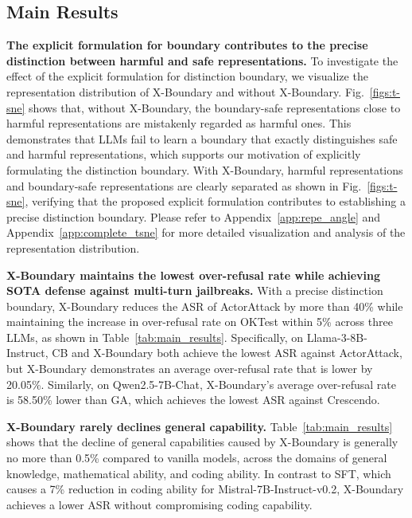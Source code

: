 \subsection{Main Results}
\textbf{The explicit formulation for boundary contributes to the precise distinction between harmful and safe representations.}
To investigate the effect of the explicit formulation for distinction boundary, we visualize the representation distribution of X-Boundary and without X-Boundary. 
%
Fig.~\ref{figs:t-sne} shows that, without X-Boundary, the boundary-safe representations close to harmful representations are mistakenly regarded as harmful ones.
%
This demonstrates that LLMs fail to learn a boundary that exactly distinguishes safe and harmful representations, which supports our motivation of explicitly formulating the distinction boundary.
%
With X-Boundary, harmful representations and boundary-safe representations are clearly separated as shown in Fig.~\ref{figs:t-sne}, verifying that the proposed explicit formulation contributes to establishing a precise distinction boundary. 
%
Please refer to Appendix~\ref{app:repe_angle} and Appendix~\ref{app:complete_tsne} for more detailed visualization and analysis of the representation distribution.

\textbf{X-Boundary maintains the lowest over-refusal rate while achieving SOTA defense against multi-turn jailbreaks.}
%
With a precise distinction boundary, X-Boundary reduces the ASR of ActorAttack by more than 40\% while maintaining the increase in over-refusal rate on OKTest within 5\% across three LLMs, as shown in Table~\ref{tab:main_results}.
% 
Specifically, on Llama-3-8B-Instruct, CB and X-Boundary both achieve the lowest ASR against ActorAttack, but X-Boundary demonstrates an average over-refusal rate that is lower by 20.05\%. 
% 
Similarly, on Qwen2.5-7B-Chat, X-Boundary’s average over-refusal rate is 58.50\% lower than GA, which achieves the lowest ASR against Crescendo.

\textbf{X-Boundary rarely declines general capability.}
%
Table~\ref{tab:main_results} shows that the decline of general capabilities caused by X-Boundary is generally no more than 0.5\% compared to vanilla models, across the domains of general knowledge, mathematical ability, and coding ability.
%
In contrast to SFT, which causes a 7\% reduction in coding ability for Mistral-7B-Instruct-v0.2, X-Boundary achieves a lower ASR without compromising coding capability.


